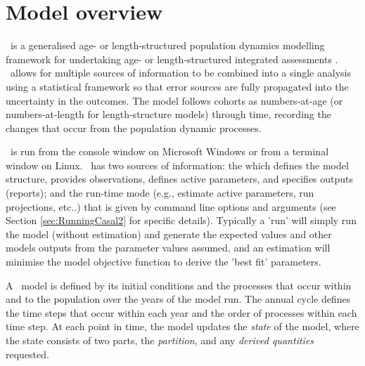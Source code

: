 \section{Model overview\label{sec:Overview}}

\CNAME\ is a generalised age- or length-structured population dynamics modelling framework for undertaking age- or length-structured integrated assessments \citep{Maunder_2013}. \CNAME\ allows for multiple sources of information to be combined into a single analysis using a statistical framework so that error sources are fully propagated into the uncertainty in the outcomes. The model follows cohorts as numbers-at-age (or numbers-at-length for length-structure models) through time, recording the changes that occur from the population dynamic processes.

\CNAME\ is run from the console window on Microsoft Windows or from a terminal window on Linux. \CNAME\ has two sources of information: the \emph{\config} which  defines the model structure, provides observations, defines active parameters, and specifies outputs (reports); and the run-time mode (e.g., estimate active parameters, run projections, etc..) that is given by command line options and arguments (see Section \ref{sec:RunningCasal2} for specific details). Typically a 'run' will simply run the model (without estimation) and generate the expected values and other models outputs from the parameter values assumed, and an estimation will minimise the model objective function to derive the 'best fit' parameters.

A \CNAME\ model is defined by its initial conditions and the processes that occur within and to the population over the years of the model run. The annual cycle defines the time steps that occur within each year and the order of processes within each time step. At each point in time, the model updates the \emph{state} of the model, where the state consists of two parts, the \emph{partition}, and any \emph{derived quantities} requested.

